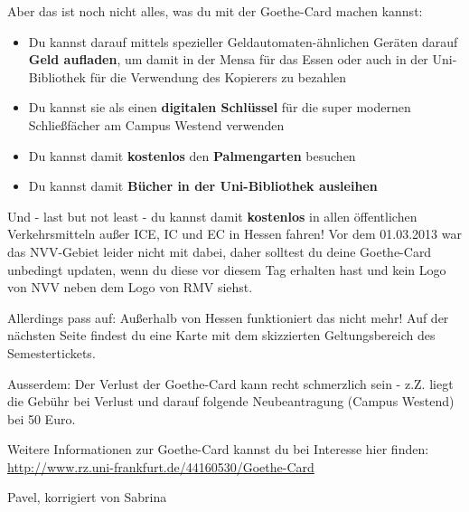 Aber das ist noch nicht alles, was du mit der Goethe-Card machen kannst:

\begin{itemize}
	\item Du kannst darauf mittels spezieller Geldautomaten-ähnlichen Geräten darauf \textbf{Geld aufladen}, um damit in der Mensa für das Essen oder auch in der Uni-Bibliothek für die Verwendung des Kopierers zu bezahlen
	\item Du kannst sie als einen \textbf{digitalen Schlüssel} für die super modernen Schließfächer am Campus Westend verwenden
	\item Du kannst damit \textbf{kostenlos} den \textbf{Palmengarten} besuchen
	\item Du kannst damit\textbf{ Bücher in der Uni-Bibliothek ausleihen}
\end{itemize}

Und - last but not least - du kannst damit \textbf{kostenlos} in allen öffentlichen Verkehrsmitteln außer ICE, IC und EC in Hessen fahren! Vor dem 01.03.2013 war das NVV-Gebiet leider nicht mit dabei, daher solltest du deine Goethe-Card unbedingt updaten, wenn du diese vor diesem Tag erhalten hast und kein Logo von NVV neben dem Logo von RMV siehst.

Allerdings pass auf: Außerhalb von Hessen funktioniert das nicht mehr! Auf der nächsten Seite findest du eine Karte mit dem skizzierten Geltungsbereich des Semestertickets.

Ausserdem: Der Verlust der Goethe-Card kann recht schmerzlich sein - z.Z. liegt die Gebühr bei Verlust und darauf folgende Neubeantragung (Campus Westend) bei 50 Euro.

Weitere Informationen zur Goethe-Card kannst du bei Interesse hier finden:\\
\url{http://www.rz.uni-frankfurt.de/44160530/Goethe-Card}
\begin{flushright}Pavel, korrigiert von Sabrina \end{flushright}